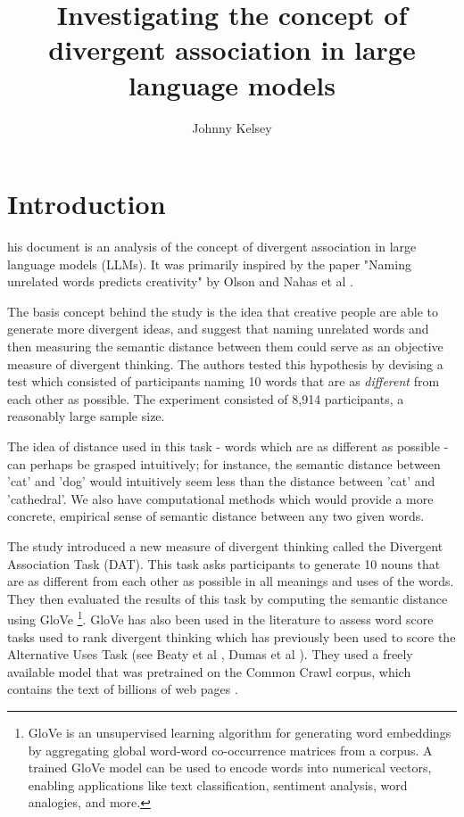 \documentclass[9pt,a4paper,twoside]{rho-class/rho}
\title{Investigating the concept of divergent association in large language models}
\author[1,$\dagger$]{Johnny Kelsey}
\begin{document}
	
    \maketitle
    \thispagestyle{firststyle}
    \linenumbers


\section{Introduction}

    his document is an analysis of the concept of divergent association in large language models (LLMs). It was primarily inspired by the paper "Naming unrelated words predicts creativity"  by Olson and Nahas et al \cite{Olson_2021}. 

The basis concept behind the study is the idea that creative people are able to generate more divergent ideas, and suggest that naming unrelated words and then measuring the semantic distance between them could serve as an objective measure of divergent thinking. The authors tested this hypothesis by devising a test which consisted of participants naming 10 words that are as \emph{different} from each other as possible. The experiment consisted of 8,914 participants, a reasonably large sample size. 

The idea of distance used in this task - words which are as different as possible - can perhaps be grasped intuitively; for instance, the semantic distance between 'cat' and 'dog' would intuitively seem less than the distance between 'cat' and 'cathedral'. We also have computational methods which would provide a more concrete, empirical sense of semantic distance between any two given words. 

The study introduced a new measure of divergent thinking called the Divergent Association Task (DAT). This task asks participants to generate 10 nouns that are as different from each other as possible in all meanings and uses of the words. They then evaluated the results of this task by computing the semantic distance using GloVe \cite{Pennington_2014} \footnote{GloVe is an unsupervised learning algorithm for generating word embeddings by aggregating global word-word co-occurrence matrices from a corpus. A trained GloVe model can be used to encode words into numerical vectors, enabling applications like text classification, sentiment analysis, word analogies, and more.}.  GloVe has also been used in the literature to assess word score tasks used to rank divergent thinking which has previously been used to score the Alternative Uses Task (see Beaty et al  \cite{beaty2021automating}, Dumas et al \cite{dumas2021measuring}). They used a freely available model that was pretrained on the Common Crawl corpus, which contains the text of billions of web pages \cite{Pennington_2014}.
\end{document}
